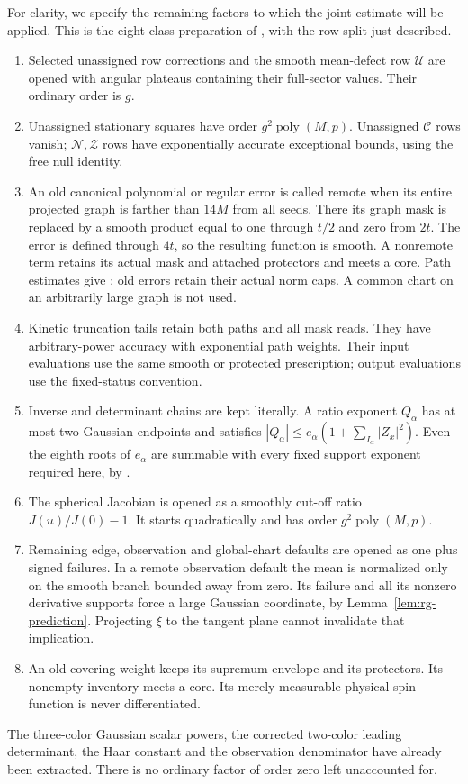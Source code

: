 For clarity, we specify the remaining factors to which the joint
estimate will be applied.  This is the eight-class preparation of
, with the row split just described.
\begin{enumerate}[label=(\roman*)]
\item Selected unassigned row corrections and the smooth mean-defect
row $\mathcal U$ are opened with angular plateaus containing their
full-sector values.  Their ordinary order is $g$.
\item Unassigned stationary squares have order
$g^2\operatorname{poly}(M,p)$.  Unassigned $\mathcal C$ rows vanish;
$\mathcal N,\mathcal Z$ rows have exponentially accurate exceptional
bounds, using the free null identity.
\item An old canonical polynomial or regular error is called remote
when its entire projected graph is farther than $14M$ from all seeds.
There its graph mask is replaced by a smooth product equal to one
through $t/2$ and zero from $2t$.  The error is defined through $4t$,
so the resulting function is smooth.  A nonremote term retains its
actual mask and attached protectors and meets a core.  Path estimates
give ; old errors retain their actual
norm caps.  A common chart on an arbitrarily large graph is not used.
\item Kinetic truncation tails retain both paths and all mask reads.
They have arbitrary-power accuracy with exponential path weights.
Their input evaluations use the same smooth or protected prescription;
output evaluations use the fixed-status convention.
\item Inverse and determinant chains are kept literally.  A ratio
exponent $Q_\alpha$ has at most two Gaussian endpoints and satisfies
$|Q_\alpha|\le e_\alpha(1+\sum_{I_\alpha}|Z_x|^2)$.  Even the eighth
roots of $e_\alpha$ are summable with every fixed support exponent
required here, by .
\item The spherical Jacobian is opened as a smoothly cut-off ratio
$J(u)/J(0)-1$.  It starts quadratically and has order
$g^2\operatorname{poly}(M,p)$.
\item Remaining edge, observation and global-chart defaults are
opened as one plus signed failures.  In a remote observation default
the mean is normalized only on the smooth branch bounded away from
zero.  Its failure and all its nonzero derivative supports force a
large Gaussian coordinate, by Lemma~\ref{lem:rg-prediction}.  Projecting
$\xi$ to the tangent plane cannot invalidate that implication.
\item An old covering weight keeps its supremum envelope and its
protectors.  Its nonempty inventory meets a core.  Its merely
measurable physical-spin function is never differentiated.
\end{enumerate}
The three-color Gaussian scalar powers, the corrected two-color
leading determinant, the Haar constant and the observation denominator
have already been extracted.  There is no ordinary factor of order
zero left unaccounted for.

